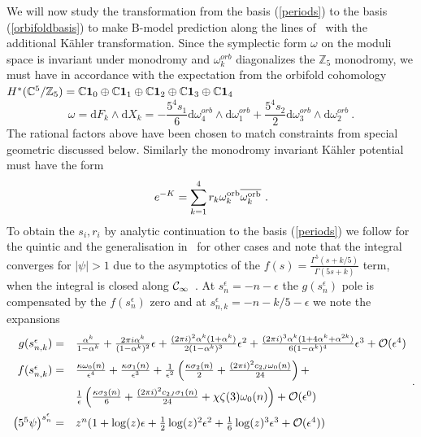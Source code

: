 \documentclass[12pt]{article}
\def\dd{\mathrm{d}}
\def\a{\alpha}
\def\eps{\epsilon}
\begin{document}
We will now study  the transformation from the basis
(\ref{periods}) to the basis (\ref{orbifoldbasis}) to make B-model
prediction along the lines of~\cite{Aganagic:2006wq} with the
additional K\"ahler transformation. Since the symplectic form
$\omega$ on the moduli space is  invariant under monodromy and
$\omega_k^{orb}$ diagonalizes the $\mathbb{Z}_5$ monodromy, we
must have in accordance with the expectation from the orbifold
cohomology $H^*(\mathbb{C}^5/\mathbb{Z}_5)=\mathbb{C}{\bf
1}_0\oplus\mathbb{C}{\bf 1}_1\oplus\mathbb{C}{\bf
1}_2\oplus\mathbb{C} {\bf 1}_3\oplus\mathbb{C}{\bf 1}_4$
\begin{equation}
\omega=\dd F_k\wedge \dd X_k= -\frac{5^4s_1}{6}\dd
\omega^{orb}_4\wedge \dd \omega^{orb}_1+ \frac{5^4s_2}{2}\dd
\omega^{orb}_3\wedge \dd \omega^{orb}_2\ .
\end{equation}
The rational factors above have been chosen to match constraints
from special geometric discussed below.  Similarly the monodromy
invariant K\"ahler potential must have the form
\begin{equation}
e^{-K}=\sum_{k=1}^4 r_k \omega_k^{\rm orb} \overline{\omega_k^{\rm orb}}\ .
\label{eK}
\end{equation}
To obtain the $s_i,r_i$ by analytic continuation to the basis (\ref{periods}) we follow \cite{Candelas:1990rm} for the
quintic and the generalisation in~\cite{Klemm:1992tx} for other cases and  note that the integral converges for
$|\psi|>1$ due to the asymptotics of the $f(s)=\frac{\Gamma^5(s+k/5)}{\Gamma(5s+k)}$ term,
when the integral is closed along ${\cal C}_\infty$~\cite{Candelas:1990rm}. At $s^\eps_{n}=-n-\epsilon$
the  $g(s^\eps_{n})$ pole is compensated by the  $f(s^\eps_{n})$ zero and at
$s^\eps_{n,k}= -n-k/5-\epsilon$ we note the expansions
\begin{equation}
\begin{array}{rl}
g(s^\eps_{n,k})=&{\frac{\a^k}{1-\a^k}+
\frac{2\pi i\a^k}{(1-\a^k)^2}\eps+
\frac{(2\pi i)^2\a^k(1+\a^k)}{2(1-\a^k)^3}\eps^2+
\frac{(2\pi i)^3\a^k(1+4\a^k+\a^{2k})}{6(1-\a^k)^4}\eps^3+{\cal O}(\eps^4)}\\[3 mm]
f(s^\eps_{n,k})=&{\frac{\kappa \omega_0(n)}{\eps^4}+
\frac{\kappa \sigma_1(n)}{\eps^3}+
\frac{1}{\eps^2}\left(\frac{\kappa \sigma_2(n)}{2}+\frac{(2\pi i)^2c_{2J} \omega_0(n)}{24}\right)+}\\[3 mm]
&{\frac{1}{\eps}\left(\frac{\kappa \sigma_3(n)}{6}+\frac{(2\pi i)^2 c_{2J}\sigma_1(n)}{24}+\chi \zeta(3)
\omega_0(n)\right)+{\cal O}(\eps^0)}\\[3 mm]
\left(5^5\psi\right)^{s^\eps_n}=&{z^n(1+\log(z)\eps+\frac{1}{2}\log(z)^2\eps^2+\frac{1}{6}\log(z)^3\eps^3+{\cal O}(\eps^4)})
\end{array}.
\end{equation}
\end{document}
